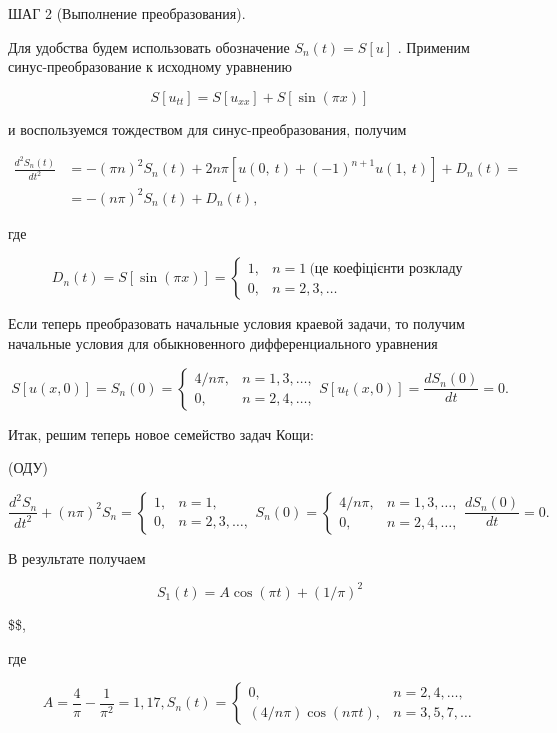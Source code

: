 \documentclass[
  ukrainian,
]{article}
\begin{document}
ШАГ 2 (Выполнение преобразования).

Для удобства будем использовать обозначение \(S_n(t) = S[u]\) . Применим
синус-преобразование к исходному уравнению

\[
S[u_{tt}] = S[u_{xx}] + S[\sin(\pi x)]
\]

и воспользуемся тождеством для синус-преобразования, получим

\[
\begin{split} \frac{d^2S_n\left(t\right)}{dt^2} &= -\left(\pi n\right)^2S_n\left(t\right) + 2n\pi\left[u\left(0,\ t\right) + \left(-1\right)^{n+1}u\left(1,\ t\right)\right] + D_n\left(t\right) = \\ &= -\left(n\pi\right)^2S_n\left(t\right) + D_n\left(t\right),  \end{split}
\]

где

\[
D_n(t) = S[\sin(\pi x)] = \begin{cases} 1, & n = 1 \ \text{(це коефіцієнти розкладу} \\0, &n = 2, 3, \dots \end{cases}
\]

Если теперь преобразовать начальные условия краевой задачи, то получим
начальные условия для обыкновенного дифференциального уравнения

\[
S[u(x, 0)] = S_n(0) = \begin{cases} 4/n\pi, & n = 1, 3, \dots, \\ 0, &n = 2, 4, \dots, \end{cases}
S[u_t(x, 0)] = \frac{dS_n(0)}{dt} = 0.
\]

Итак, решим теперь новое семейство задач Кощи:

(ОДУ)

\[
\frac{d^2S_n}{dt^2} + (n\pi)^2 S_n = \begin{cases} 1, &n = 1, \\ 0, &n = 2, 3, \dots, \end{cases}
S_n(0) = \begin{cases}
4/n\pi, & n = 1, 3, \dots, \\
0, & n = 2, 4, \dots,
\end{cases}
\frac{dS_n(0)}{dt} = 0.
\]

В результате получаем

\[
S_1(t) = A\cos(\pi t) + (1/\pi)^2
\]

\$\$,

где

\[
A = \frac{4}{\pi} - \frac{1}{\pi^2} = 1,17,
S_n(t) = \begin{cases} 0, &n = 2, 4, \dots, \\ (4/n\pi)\cos(n\pi t), &n = 3, 5, 7, \dots \end{cases}
\]
\end{document}
